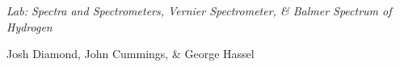 {\LARGE {\em \noindent Lab: Spectra and Spectrometers, Vernier Spectrometer, \&
Balmer Spectrum of Hydrogen}} 

\large{\noindent Josh Diamond, John Cummings, \& George Hassel}

